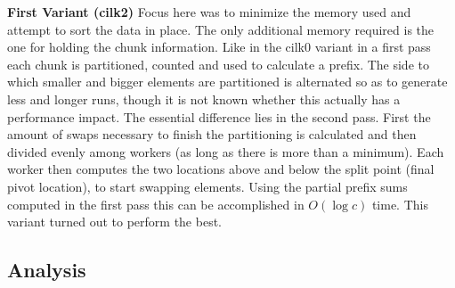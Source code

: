 \documentclass[12pt,a4paper]{article}
\begin{document}
\textbf{First Variant (cilk2)}\newline
Focus here was to minimize the memory used and attempt to sort the data in place. The only additional memory required is the one for holding the chunk information. Like in the cilk0 variant in a first pass each chunk is partitioned, counted and used to calculate a prefix. The side to which smaller and bigger elements are partitioned is alternated so as to generate less and longer runs, though it is not known whether this actually has a performance impact. The essential difference lies in the second pass. First the amount of swaps necessary to finish the partitioning is calculated and then divided evenly among workers (as long as there is more than a minimum). Each worker then computes the two locations above and below the split point (final pivot location), to start swapping elements. Using the partial prefix sums computed in the first pass this can be accomplished in $O(\log c)$ time. This variant turned out to perform the best.
\subsection{Analysis}
\end{document}

